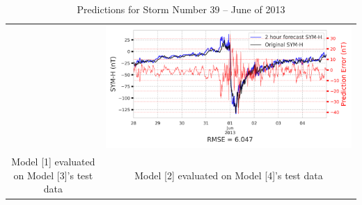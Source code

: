 \documentclass[draft,sw]{agutexSI2019}
\begin{document}
\begin{table}
\begin{tabular}{cc}
&
\includegraphics[width=0.49\linewidth]{paper_plots/2h_swics_model_on_no_swics/2h_swics_model_on_no_swics_storm_39.png}
\\
Model [1] evaluated on Model [3]'s test data & Model [2] evaluated on Model [4]'s test data
\vspace*{12pt}
\\
\end{tabular}
\caption{Predictions for Storm Number 39 -- June of 2013}
\label{storm-39}
\end{table}
\end{document}
